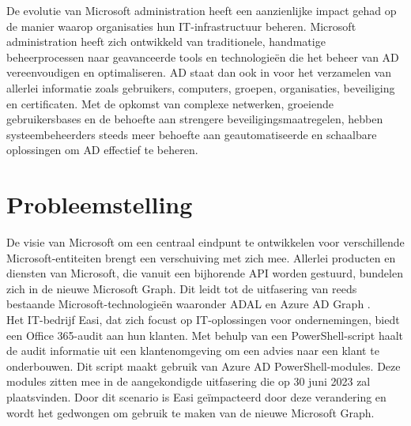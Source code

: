 De evolutie van Microsoft administration heeft een aanzienlijke impact gehad op de manier waarop organisaties hun \ac{IT}-infrastructuur beheren. Microsoft administration heeft zich ontwikkeld van traditionele, handmatige beheerprocessen naar geavanceerde tools en technologieën die het beheer van \ac{AD} vereenvoudigen en optimaliseren. \ac{AD} staat dan ook in voor het verzamelen van allerlei informatie zoals gebruikers, computers, groepen, organisaties, beveiliging en certificaten. Met de opkomst van complexe netwerken, groeiende gebruikersbases en de behoefte aan strengere beveiligingsmaatregelen, hebben systeembeheerders steeds meer behoefte aan geautomatiseerde en schaalbare oplossingen om \ac{AD} effectief te beheren. \\

\section{Probleemstelling}
\label{sec:probleemstelling}

\begin{comment}
Uit je probleemstelling moet duidelijk zijn dat je onderzoek een meerwaarde heeft voor een concrete doelgroep. De doelgroep moet goed gedefinieerd en afgelijnd zijn. Doelgroepen als ``bedrijven,'' ``KMO's'', systeembeheerders, enz.~zijn nog te vaag. Als je een lijstje kan maken van de personen/organisaties die een meerwaarde zullen vinden in deze bachelorproef (dit is eigenlijk je steekproefkader), dan is dat een indicatie dat de doelgroep goed gedefinieerd is. Dit kan een enkel bedrijf zijn of zelfs één persoon (je co-promotor/opdrachtgever).
\end{comment}


De visie van Microsoft om een centraal eindpunt te ontwikkelen voor verschillende Microsoft-entiteiten brengt een verschuiving met zich mee. Allerlei producten en diensten van Microsoft, die vanuit een bijhorende \ac{API} worden gestuurd, bundelen zich in de nieuwe Microsoft Graph. Dit leidt tot de uitfasering van reeds bestaande Microsoft-technologieën waaronder \ac{ADAL} en Azure \Ac{AD} Graph \autocite{Sahay2022}. \\

Het \ac{IT}-bedrijf Easi, dat zich focust op \ac{IT}-oplossingen voor ondernemingen, biedt een Office 365-audit aan hun klanten. Met behulp van een PowerShell-script haalt de audit informatie uit een klantenomgeving om een advies naar een klant te onderbouwen. Dit script maakt gebruik van Azure \ac{AD} PowerShell-modules. Deze modules zitten mee in de aangekondigde uitfasering die op 30 juni 2023 zal plaatsvinden. Door dit scenario is Easi geïmpacteerd door deze verandering en wordt het gedwongen om gebruik te maken van de nieuwe Microsoft Graph. \\


